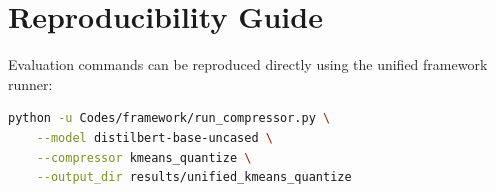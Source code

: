 \section{Reproducibility Guide}
Evaluation commands can be reproduced directly using the unified framework runner:
\begin{lstlisting}[language=bash]
python -u Codes/framework/run_compressor.py \
    --model distilbert-base-uncased \
    --compressor kmeans_quantize \
    --output_dir results/unified_kmeans_quantize
\end{lstlisting}
